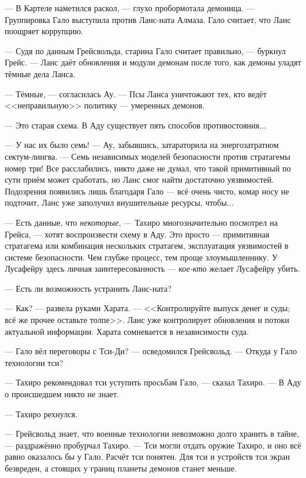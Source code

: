 --- В Картеле наметился раскол, --- глухо пробормотала демоница.
--- Группировка Гало выступила против Ланс-ната Алмаза.
Гало считает, что Ланс поощряет коррупцию.

--- Судя по данным Грейсвольда, старина Гало считает правильно, --- буркнул Грейс.
--- Ланс даёт обновления и модули демонам после того, как демоны уладят тёмные дела Ланса.

--- Тёмные, --- согласилась Ау.
--- Псы Ланса уничтожают тех, кто ведёт <<неправильную>> политику --- умеренных демонов.

--- Это старая схема.
В Аду существует пять способов противостояния...

--- У нас их было семь! --- Ау, забывшись, затараторила на энергозатратном сектум-лингва.
--- Семь независимых моделей безопасности против стратагемы номер три!
Все расслабились, никто даже не думал, что такой примитивный по сути приём может сработать, но Ланс смог найти достаточно уязвимостей.
Подозрения появились лишь благодаря Гало --- всё очень чисто, комар носу не подточит, Ланс уже заполучил внушительные ресурсы, чтобы...

--- Есть данные, что \emph{некоторые}, --- Тахиро многозначительно посмотрел на Грейса, --- хотят воспроизвести схему в Аду.
Это просто --- примитивная стратагема или комбинация нескольких стратагем, эксплуатация уязвимостей в системе безопасности.
Чем глубже процесс, тем проще злоумышленнику.
У Лусафейру здесь личная заинтересованность --- \emph{кое-кто} желает Лусафейру убить.

--- Есть ли возможность устранить Ланс-ната?

--- Как? --- развела руками Харата.
--- <<Контролируйте выпуск денег и суды; всё же прочее оставьте толпе>>.
Ланс уже контролирует обновления и потоки актуальной информации.
Харата сомневается в независимости суда.

--- Гало вёл переговоры с Тси-Ди? --- осведомился Грейсвольд.
--- Откуда у Гало технологии тси?

--- Тахиро рекомендовал тси уступить просьбам Гало, --- сказал Тахиро.
--- В Аду о происшедшем никто не знает.

--- Тахиро рехнулся.

--- Грейсвольд знает, что военные технологии невозможно долго хранить в тайне, --- раздражённо пробурчал Тахиро.
--- Тси могли отдать оружие Тахиро, и оно всё равно оказалось бы у Гало.
Расчёт тси понятен.
Для тси и устройств тси экран безвреден, а стоящих у границ планеты демонов станет меньше.

